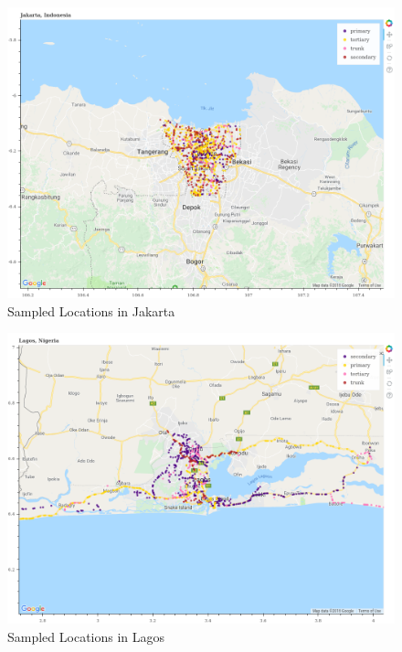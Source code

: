 \documentclass[12pt, letterpaper]{article}
\begin{document}
\begin{figure}[H]
\centering
\caption{Sampled Locations in Jakarta} \label{fig:google_jakarta}
    \includegraphics[width=\textwidth]{../figs/jakarta-gmap.png}
\end{figure}

\begin{figure}[H]
\centering
\caption{Sampled Locations in Lagos} \label{fig:google_lagos}
    \includegraphics[width=\textwidth]{../figs/lagos-gmap.png}
\end{figure}
\end{document}
